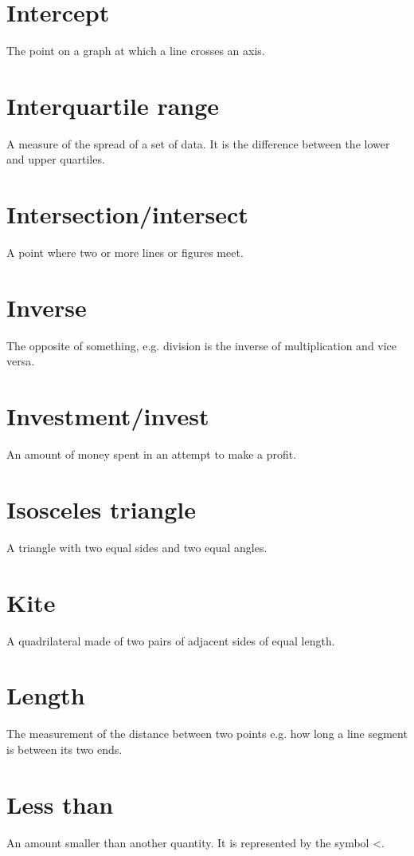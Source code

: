 \documentclass[10pt]{article}
\begin{document}
\section*{Intercept}
The point on a graph at which a line crosses an axis.

\section*{Interquartile range}
A measure of the spread of a set of data. It is the difference between the lower and upper quartiles.

\section*{Intersection/intersect}
A point where two or more lines or figures meet.

\section*{Inverse}
The opposite of something, e.g. division is the inverse of multiplication and vice versa.

\section*{Investment/invest}
An amount of money spent in an attempt to make a profit.

\section*{Isosceles triangle}
A triangle with two equal sides and two equal angles.

\section*{Kite}
A quadrilateral made of two pairs of adjacent sides of equal length.

\section*{Length}
The measurement of the distance between two points e.g. how long a line segment is between its two ends.

\section*{Less than}
An amount smaller than another quantity. It is represented by the symbol <.
\end{document}
